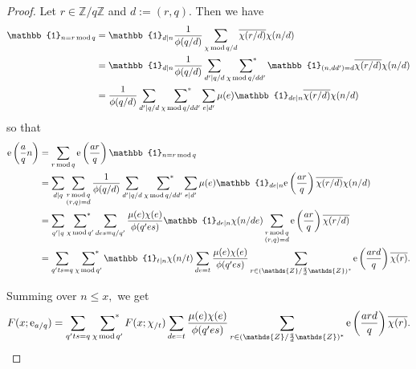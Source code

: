 \documentclass{article}
\newcommand{\Mod}{\,\mathrm{mod}\,}
\newcommand{\e}{\mathrm{e}}
\newcommand{\Z}{\mathds{Z}}
\newcommand{\Ind}{\mathbb{1}}
\newcommand{\starsum}{\ \sideset{}{^*}\sum}
\begin{document}
\begin{proof}
    Let $r\in \Z/q\Z$ and $d := (r, q).$ Then we have 
    \begin{align*}
        \Ind_{n = r \Mod q} &= \Ind_{d|n}\frac{1}{\phi(q/d)} \sum_{\chi \Mod q/d} \overline{\chi(r/d)}\chi(n/d)
        \\&= \Ind_{d|n}\frac{1}{\phi(q/d)} \sum_{d' | q/d} \starsum_{\chi\Mod q/dd'} \Ind_{(n, dd') = d} \overline{\chi(r/d)} \chi(n/d)
        \\&=\frac{1}{\phi(q/d)} \sum_{d' | q/d} \starsum_{\chi\Mod q/dd'} \sum_{e|d'} \mu(e) \Ind_{de|n} \overline{\chi(r/d)} \chi(n/d)
    \end{align*}
    so that
    \begin{align*}
        \e\left(\frac{a}{q}n\right) &= \sum_{r\Mod q} \e\left(\frac{ar}{q}\right) \Ind_{n = r \Mod q}
        \\&= \sum_{d|q} \sum_{\substack{r \Mod q \\ (r, q) = d}} \frac{1}{\phi(q/d)} \sum_{d' | q/d} \starsum_{\chi\Mod q/dd'} \sum_{e|d'} \mu(e) \Ind_{de|n} \e\left(\frac{ar}{q}\right) \overline{\chi(r/d)} \chi(n/d)
        \\&= \sum_{q'|q} \starsum_{\chi\Mod q'} \sum_{des = q/q'} \frac{\mu(e)\chi(e)}{\phi(q'es)} \Ind_{de|n} \chi(n/de) \sum_{\substack{r\Mod q \\ (r, q) = d}} \e\left(\frac{ar}{q}\right) \overline{\chi(r/d)}
        \\&= \sum_{q'ts = q} \starsum_{\chi\Mod q'} \Ind_{t|n}\chi(n/t) \sum_{de = t} \frac{\mu(e)\chi(e)}{\phi(q'es)} \sum_{r\in (\Z/\frac{q}{d}\Z)^*} \e\left(\frac{ard}{q}\right) \overline{\chi(r)}.
    \end{align*}

    Summing over $n\le x,$ we get \begin{equation}\label{step18}
        F(x; \e_{a/q}) = \sum_{q'ts = q} \starsum_{\chi\Mod q'} F(x ; \chi_{/t}) \sum_{de = t} \frac{\mu(e)\chi(e)}{\phi(q'es)} \sum_{r\in (\Z/\frac{q}{d}\Z)^*} \e\left(\frac{ard}{q}\right) \overline{\chi(r)}.
    \end{equation}


\end{proof}
\end{document}
